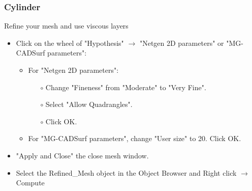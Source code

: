 \documentclass[10pt, hyperref={unicode=true,pdfusetitle, bookmarks=true,bookmarksnumbered=false,bookmarksopen=false, breaklinks=false,pdfborder={0 0 1},backref=true,colorlinks=true,linkcolor=darkblue,pageanchor}]{beamer}
\begin{document}
\begin{frame}
\frametitle{Cylinder}
\begin{block}{Refine your mesh and use viscous layers}

\begin{itemize}
\item Click on the wheel of "Hypothesis" $\rightarrow$ "Netgen 2D parameters" or "MG-CADSurf parameters":
    \begin{itemize}
    \item For "Netgen 2D parameters":
        \begin{itemize}
        \item [$\circ$] Change "Fineness" from "Moderate" to "Very Fine".
        \item [$\circ$] Select "Allow Quadrangles".
        \item [$\circ$] Click OK.
        \end{itemize}
    \item For "MG-CADSurf parameters", change "User size" to 20. Click OK.
    \end{itemize}
\item "Apply and Close" the close mesh window.
\item Select the Refined\_Mesh object in the Object Browser and Right click $\rightarrow$ Compute
\end{itemize}

\end{block}
\end{frame}
\end{document}
